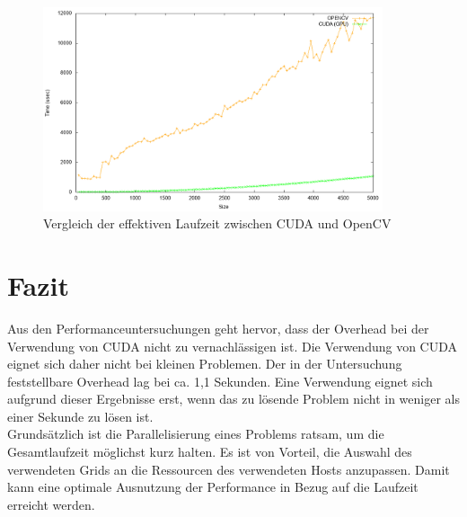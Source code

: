 \documentclass{llncs}
\begin{document}
\begin{figure}
	\centering
	\includegraphics[width=10cm,keepaspectratio]{analysis_no_plain.png}
	\caption{Vergleich der effektiven Laufzeit zwischen CUDA und OpenCV}
	\label{fig:analysis_no_plain}
\end{figure}

%
\section{Fazit}
%

Aus den Performanceuntersuchungen geht hervor, dass der Overhead bei der Verwendung von CUDA nicht zu vernachlässigen ist. Die Verwendung von CUDA eignet sich daher nicht bei kleinen Problemen. Der in der Untersuchung feststellbare Overhead lag bei ca. 1,1 Sekunden. Eine Verwendung eignet sich aufgrund dieser Ergebnisse erst, wenn das zu lösende Problem nicht in weniger als einer Sekunde zu lösen ist.\\

Grundsätzlich ist die Parallelisierung eines Problems ratsam, um die Gesamtlaufzeit möglichst kurz halten.
Es ist von Vorteil, die Auswahl des verwendeten Grids an die Ressourcen des verwendeten Hosts anzupassen. Damit kann eine optimale Ausnutzung der Performance in Bezug auf die Laufzeit erreicht werden.
%
\end{document}
